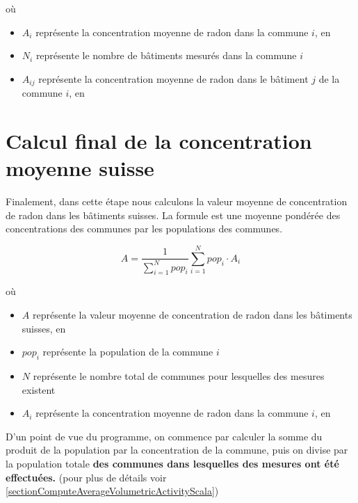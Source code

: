 où 
\begin{itemize}
\item $A_i$ représente la concentration moyenne de radon dans la commune $i$, en \bqmc
\item $N_i$ représente le nombre de bâtiments mesurés dans la commune $i$
\item $A_{ij}$ représente la concentration moyenne de radon dans le bâtiment $j$ de la commune $i$, en \bqmc
\end{itemize}

\section{Calcul final de la concentration moyenne suisse}
Finalement, dans cette étape nous calculons la valeur moyenne de concentration de radon dans les bâtiments suisses. La formule est une moyenne pondérée des concentrations des communes par les populations des communes.

\begin{equation}
A = \frac{1}{\sum_{i=1}^{N} pop_i} \sum_{i=1}^{N} pop_i \cdot A_i
\end{equation}

où
\begin{itemize}
\item $A$ représente la valeur moyenne de concentration de radon dans les bâtiments suisses, en \bqmc
\item $pop_i$ représente la population de la commune $i$
\item $N$ représente le nombre total de communes pour lesquelles des mesures existent
\item $A_i$ représente la concentration moyenne de radon dans la commune $i$, en \bqmc
\end{itemize}

D'un point de vue du programme, on commence par calculer la somme du produit de la population par la concentration de la commune, puis on divise par la population totale \textbf{des communes dans lesquelles des mesures ont été effectuées.} (pour plus de détails voir \ref{sectionComputeAverageVolumetricActivityScala})
